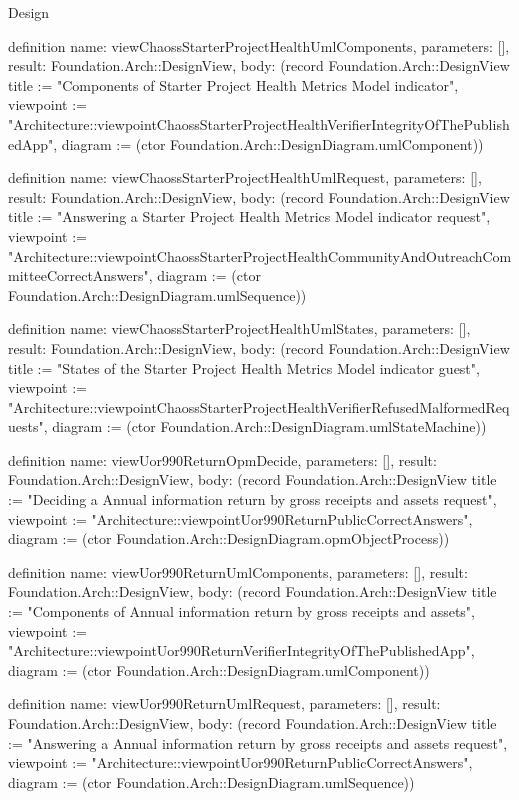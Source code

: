 \begin{lexlean}{Design}
\begin{semanticmodule}
definition{
  name: viewChaossStarterProjectHealthUmlComponents,
  parameters: [],
  result: Foundation.Arch::DesignView,
  body: (record Foundation.Arch::DesignView {title := "Components of Starter Project Health Metrics Model indicator", viewpoint := "Architecture::viewpointChaossStarterProjectHealthVerifierIntegrityOfThePublishedApp", diagram := (ctor Foundation.Arch::DesignDiagram.umlComponent)})
}

definition{
  name: viewChaossStarterProjectHealthUmlRequest,
  parameters: [],
  result: Foundation.Arch::DesignView,
  body: (record Foundation.Arch::DesignView {title := "Answering a Starter Project Health Metrics Model indicator request", viewpoint := "Architecture::viewpointChaossStarterProjectHealthCommunityAndOutreachCommitteeCorrectAnswers", diagram := (ctor Foundation.Arch::DesignDiagram.umlSequence)})
}

definition{
  name: viewChaossStarterProjectHealthUmlStates,
  parameters: [],
  result: Foundation.Arch::DesignView,
  body: (record Foundation.Arch::DesignView {title := "States of the Starter Project Health Metrics Model indicator guest", viewpoint := "Architecture::viewpointChaossStarterProjectHealthVerifierRefusedMalformedRequests", diagram := (ctor Foundation.Arch::DesignDiagram.umlStateMachine)})
}

definition{
  name: viewUor990ReturnOpmDecide,
  parameters: [],
  result: Foundation.Arch::DesignView,
  body: (record Foundation.Arch::DesignView {title := "Deciding a Annual information return by gross receipts and assets request", viewpoint := "Architecture::viewpointUor990ReturnPublicCorrectAnswers", diagram := (ctor Foundation.Arch::DesignDiagram.opmObjectProcess)})
}

definition{
  name: viewUor990ReturnUmlComponents,
  parameters: [],
  result: Foundation.Arch::DesignView,
  body: (record Foundation.Arch::DesignView {title := "Components of Annual information return by gross receipts and assets", viewpoint := "Architecture::viewpointUor990ReturnVerifierIntegrityOfThePublishedApp", diagram := (ctor Foundation.Arch::DesignDiagram.umlComponent)})
}

definition{
  name: viewUor990ReturnUmlRequest,
  parameters: [],
  result: Foundation.Arch::DesignView,
  body: (record Foundation.Arch::DesignView {title := "Answering a Annual information return by gross receipts and assets request", viewpoint := "Architecture::viewpointUor990ReturnPublicCorrectAnswers", diagram := (ctor Foundation.Arch::DesignDiagram.umlSequence)})
}


\end{semanticmodule}
\end{lexlean}
